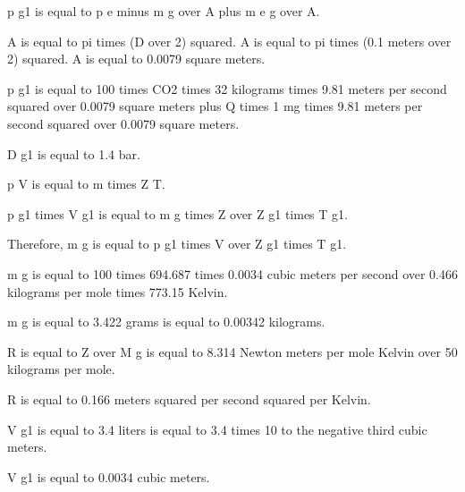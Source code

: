 p g1 is equal to p e minus m g over A plus m e g over A.

A is equal to pi times (D over 2) squared.
A is equal to pi times (0.1 meters over 2) squared.
A is equal to 0.0079 square meters.

p g1 is equal to 100 times CO2 times 32 kilograms times 9.81 meters per second squared over 0.0079 square meters plus Q times 1 mg times 9.81 meters per second squared over 0.0079 square meters.

D g1 is equal to 1.4 bar.

p V is equal to m times Z T.

p g1 times V g1 is equal to m g times Z over Z g1 times T g1.

Therefore, m g is equal to p g1 times V over Z g1 times T g1.

m g is equal to 100 times 694.687 times 0.0034 cubic meters per second over 0.466 kilograms per mole times 773.15 Kelvin.

m g is equal to 3.422 grams is equal to 0.00342 kilograms.

R is equal to Z over M g is equal to 8.314 Newton meters per mole Kelvin over 50 kilograms per mole.

R is equal to 0.166 meters squared per second squared per Kelvin.

V g1 is equal to 3.4 liters is equal to 3.4 times 10 to the negative third cubic meters.

V g1 is equal to 0.0034 cubic meters.